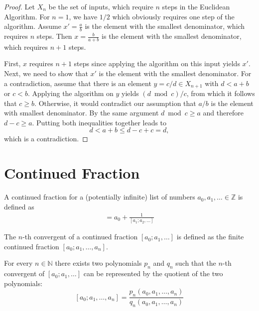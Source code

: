 \documentclass[english,version-2020-11]{uzl-thesis}
\newcommand\N{{\mathbb N}}
\newcommand\Z{{\mathbb Z}}
\begin{document}
\begin{proof}
  Let $X_n$ be the set of inputs, which require $n$ steps in the Euclidean Algorithm.
  For $n = 1$, we have $1/2$ which obviously requires one step of the algorithm.
  Assume $x' = \frac{a}{b}$ is the element with the smallest denominator, which
  requires $n$ steps.
  Then $x = \frac{b}{a+b}$ is the element with the smallest denominator,
  which requires $n + 1$ steps.

  First, $x$ requires $n + 1$ steps since applying the algorithm on this input
  yields $x'$.
  Next, we need to show that $x'$ is the element with the smallest denominator.
  For a contradiction, assume that there is an element $y = c/d \in X_{n+1}$
  with $d < a + b$ or $c < b$.
  Applying the algorithm on $y$ yields $(d \bmod c) / c$,
  from which it follows that $c \ge b$.
  Otherwise, it would contradict our assumption that $a/b$ is the element with
  smallest denominator.
  By the same argument $d \bmod c \ge a$ and therefore $d - c \ge a$.
  Putting both inequalities together leads to
  \[
    d < a + b \le d - c + c = d,
  \]
  which is a contradiction.
\end{proof}

\section{Continued Fraction}

\begin{definition}
  A continued fraction for a (potentially infinite) list of numbers $a_0, a_1,
  \dots \in \Z$ is defined as
  \begin{align*}
    [a_0; a_1, \dots] = a_0 + \frac{1}{[a_1; a_2, \dots]}
  \end{align*}
\end{definition}

\begin{definition}
  The $n$-th convergent of a continued fraction $[a_0; a_1, \dots]$
  is defined as the finite continued fraction $[a_0; a_1, \dots, a_n]$.
\end{definition}

\begin{lemma}
  For every $n \in \N$ there exists two polynomials $p_n$ and $q_n$ such that the
  $n$-th convergent of $[a_0; a_1, \dots]$ can be represented by the quotient
  of the two polynomials:
  \[
    [a_0; a_1, \dots, a_n] = \frac{p_n(a_0, a_1, \dots, a_n)}{q_n(a_0, a_1, \dots, a_n)}
  \]
\end{lemma}
\end{document}

